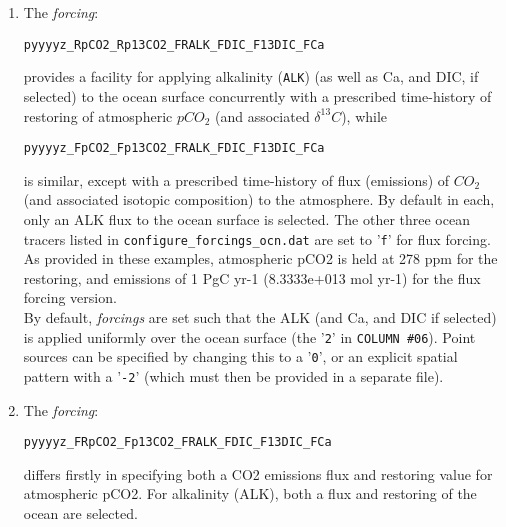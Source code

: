 \begin{enumerate}[noitemsep]

\vspace{1mm}
\item The \textit{forcing}:
\vspace{-1mm}\small\begin{verbatim}
pyyyyz_RpCO2_Rp13CO2_FRALK_FDIC_F13DIC_FCa
\end{verbatim}\normalsize\vspace{-1mm}
provides a facility for applying alkalinity (\texttt{ALK}) (as well as Ca, and DIC, if selected) to the ocean surface concurrently with a prescribed time-history of restoring of atmospheric \(pCO_{2}\) (and associated \(\delta^{13}C\)), while
\vspace{-1mm}\small\begin{verbatim}
pyyyyz_FpCO2_Fp13CO2_FRALK_FDIC_F13DIC_FCa
\end{verbatim}\normalsize\vspace{-1mm}
is similar, except with a prescribed time-history of flux (emissions) of \(CO_{2}\) (and associated isotopic composition) to the atmosphere.
By default in each, only an ALK flux to the ocean surface is selected. The other three ocean tracers listed in \texttt{configure\_forcings\_ocn.dat} are set to '\texttt{f}' for flux forcing. As provided in these examples, atmospheric pCO2 is held at 278 ppm for the restoring, and emissions of 1 PgC yr-1 (8.3333e+013 mol yr-1) for the flux forcing version.
\\ By default, \textit{forcings} are set such that the ALK (and Ca, and DIC if selected) is applied uniformly over the ocean surface (the '\texttt{2}' in \texttt{COLUMN \#06}). Point sources can be specified by changing this to a '\texttt{0}', or an explicit spatial pattern with a '\texttt{-2}' (which must then be provided in a separate file).

\vspace{1mm}
\item The \textit{forcing}:
\vspace{-1mm}\small\begin{verbatim}
pyyyyz_FRpCO2_Fp13CO2_FRALK_FDIC_F13DIC_FCa
\end{verbatim}\normalsize\vspace{-1mm}
differs firstly in specifying both a CO2 emissions flux and restoring value for atmospheric pCO2. For alkalinity (ALK), both a flux and restoring of the ocean are selected.


\end{enumerate}
